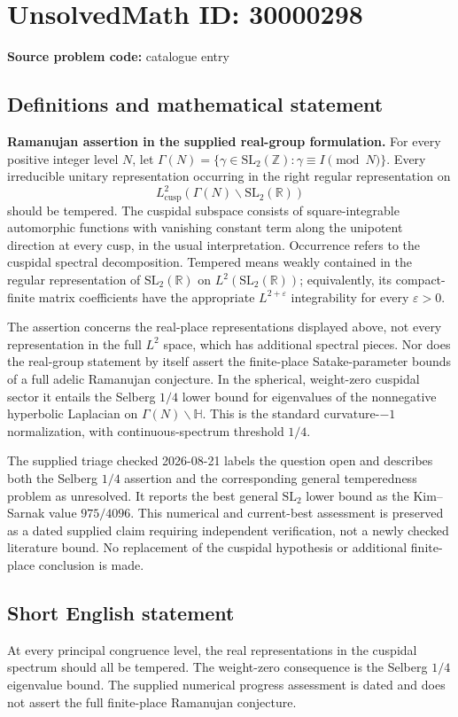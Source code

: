 \documentclass[11pt]{article}
\newcommand{\Z}{\mathbb{Z}}
\newcommand{\R}{\mathbb{R}}
\begin{document}
\section*{UnsolvedMath ID: 30000298}
\textbf{Source problem code:} catalogue entry
\subsection{Definitions and mathematical statement}
\textbf{Ramanujan assertion in the supplied real-group formulation.} For every positive integer level \(N\), let \(\Gamma(N)=\{\gamma\in\mathrm{SL}_2(\Z):\gamma\equiv I\pmod N\}\). Every irreducible unitary representation occurring in the right regular representation on\[L^2_{\mathrm{cusp}}(\Gamma(N)\backslash\mathrm{SL}_2(\R))\] should be tempered. The cuspidal subspace consists of square-integrable automorphic functions with vanishing constant term along the unipotent direction at every cusp, in the usual interpretation. Occurrence refers to the cuspidal spectral decomposition. Tempered means weakly contained in the regular representation of \(\mathrm{SL}_2(\R)\) on \(L^2(\mathrm{SL}_2(\R))\); equivalently, its compact-finite matrix coefficients have the appropriate \(L^{2+\varepsilon}\) integrability for every \(\varepsilon>0\).\par The assertion concerns the real-place representations displayed above, not every representation in the full \(L^2\) space, which has additional spectral pieces. Nor does the real-group statement by itself assert the finite-place Satake-parameter bounds of a full adelic Ramanujan conjecture. In the spherical, weight-zero cuspidal sector it entails the Selberg \(1/4\) lower bound for eigenvalues of the nonnegative hyperbolic Laplacian on \(\Gamma(N)\backslash\mathbb H\). This is the standard curvature-\(-1\) normalization, with continuous-spectrum threshold \(1/4\).\par The supplied triage checked 2026-08-21 labels the question open and describes both the Selberg \(1/4\) assertion and the corresponding general temperedness problem as unresolved. It reports the best general \(\mathrm{SL}_2\) lower bound as the Kim--Sarnak value \(975/4096\). This numerical and current-best assessment is preserved as a dated supplied claim requiring independent verification, not a newly checked literature bound. No replacement of the cuspidal hypothesis or additional finite-place conclusion is made.
\subsection{Short English statement}
At every principal congruence level, the real representations in the cuspidal spectrum should all be tempered. The weight-zero consequence is the Selberg \(1/4\) eigenvalue bound. The supplied numerical progress assessment is dated and does not assert the full finite-place Ramanujan conjecture.
\end{document}
